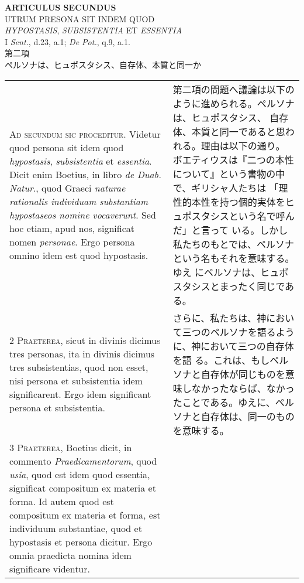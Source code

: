 \documentclass[10pt]{jsarticle} %
\begin{document}
\begin{center}
 {\Large {\bf ARTICULUS SECUNDUS}}\\
 {\large UTRUM PRESONA SIT INDEM QUOD \\ {\itshape HYPOSTASIS}, {\itshape
 SUBSISTENTIA} ET {\itshape ESSENTIA}}\\
 {\footnotesize I {\itshape Sent.}, d.23, a.1; {\itshape De Pot.}, q.9, a.1.}\\
 {\Large 第二項\\ペルソナは、ヒュポスタシス、自存体、本質と同一か}
\end{center}

\begin{longtable}{p{21em}p{21em}}

{\Huge A}{\scshape d secundum sic proceditur}. Videtur quod persona sit idem quod
{\itshape hypostasis}, {\itshape subsistentia} et {\itshape essentia}. Dicit enim Boetius, in libro {\itshape de
Duab. Natur}., quod Graeci {\itshape naturae rationalis individuam substantiam
hypostaseos nomine vocaverunt}. Sed hoc etiam, apud nos, significat nomen
{\itshape personae}. Ergo persona omnino idem est quod hypostasis.

&

第二項の問題へ議論は以下のように進められる。ペルソナは、ヒュポスタシス、
 自存体、本質と同一であると思われる。理由は以下の通り。
ボエティウスは『二つの本性について』という書物の中で、ギリシャ人たちは
 「理性的本性を持つ個的実体をヒュポスタシスという名で呼んだ」と言って
 いる。しかし私たちのもとでは、ペルソナという名もそれを意味する。ゆえ
 にペルソナは、ヒュポスタシスとまったく同じである。



\\




2 {\scshape Praeterea}, sicut in divinis dicimus tres personas, ita in divinis
dicimus tres subsistentias, quod non esset, nisi persona et subsistentia
idem significarent. Ergo idem significant persona et subsistentia.

&

さらに、私たちは、神において三つのペルソナを語るように、神において三つの自存体を語
 る。これは、もしペルソナと自存体が同じものを意味しなかったならば、なかっ
 たことである。ゆえに、ペルソナと自存体は、同一のものを意味する。

\\



3 {\scshape Praeterea}, Boetius dicit, in commento {\itshape Praedicamentorum}, quod {\itshape usia}, quod
est idem quod essentia, significat compositum ex materia et forma. Id
autem quod est compositum ex materia et forma, est individuum
substantiae, quod et hypostasis et persona dicitur. Ergo omnia praedicta
nomina idem significare videntur.


\end{longtable}
\end{document}
